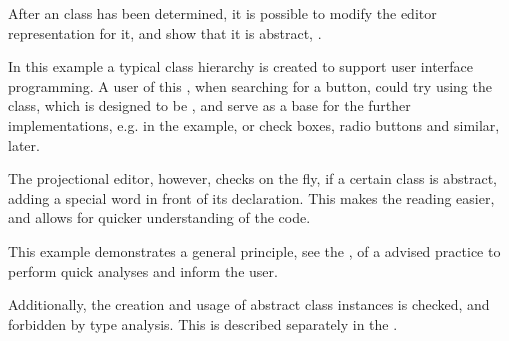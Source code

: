 After an  class has been determined, it is possible to modify the editor representation for it, 
and show that it is abstract, .

In this example a typical class hierarchy is created to support user interface programming. A user of this , when 
searching for a button, could try using the  class, which is designed to be , and serve as a 
base for the further implementations, e.g.  in the example, or check boxes, radio buttons and similar,
later.


The projectional editor, however, checks on the fly, if a certain class is abstract, adding a special  word 
in front of its declaration. This makes the reading easier, and allows for quicker understanding of the code. 

This example demonstrates a general principle, see  the , of a advised practice to 
perform quick analyses and inform the user.

Additionally, the creation and usage of abstract class instances is checked, and forbidden by type analysis. This is 
described separately in the .
